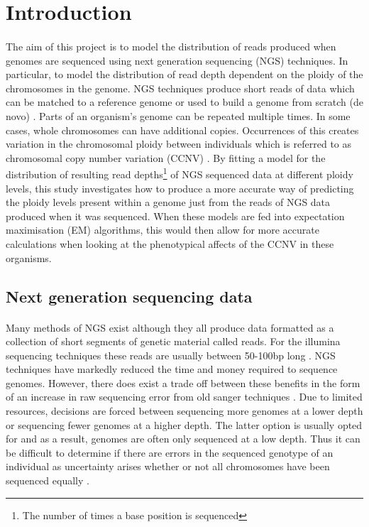 \documentclass[11pt]{article}
\begin{document}
\section{Introduction} 
\paragraph{}The aim of this project is to model the distribution of reads produced when genomes are sequenced using next generation sequencing (NGS) techniques. In particular, to model the distribution of read depth dependent on the ploidy of the chromosomes in the genome. NGS techniques produce short reads of data which can be matched to a reference genome or used to build a genome from scratch (de novo) \autocite{Jason2015}. Parts of an organism's genome can be repeated multiple times. In some cases, whole chromosomes can have additional copies. Occurrences of this creates variation in the chromosomal ploidy between individuals which is referred to as chromosomal copy number variation (CCNV) \autocite{Spring2013}. By fitting a model for the distribution of resulting read depths\footnote{The number of times a base position is sequenced} of NGS sequenced data at different ploidy levels, this study investigates how to produce a more accurate way of predicting the ploidy levels present within a genome just from the reads of NGS data produced when it was sequenced. When these models are fed into expectation maximisation (EM) algorithms, this would then allow for more accurate calculations when looking at the phenotypical affects of the CCNV in these organisms.
\subsection{Next generation sequencing data}
\paragraph{}Many methods of NGS exist although they all produce data formatted as a collection of short segments of genetic material called reads. For the illumina sequencing techniques these reads are usually between 50-100bp long \autocite{Fumagalli2013}. NGS techniques have markedly reduced the time and money required to sequence genomes. However, there does exist a trade off between these benefits in the form of an increase in raw sequencing error from old sanger techniques \autocite{Fumagalli2013}. Due to limited resources, decisions are forced between sequencing more genomes at a lower depth or sequencing fewer genomes at a higher depth. The latter option is usually opted for and as a result, genomes are often only sequenced at a low depth. Thus it can be difficult to determine if there are errors in the sequenced genotype of an individual as uncertainty arises whether or not all chromosomes have been sequenced equally \autocite{Fumagalli2013}.   
\end{document}
